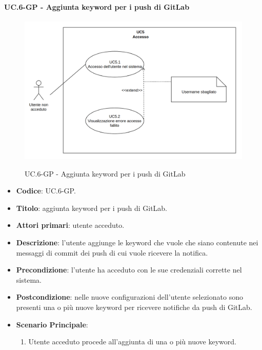 			\paragraph{UC\theuccount.6-GP - Aggiunta keyword per i push di GitLab}
				\begin{figure}[H]
					\centering
					\includegraphics[width=\columnwidth]{img/UC5.png}\\
					\caption{UC\theuccount.6-GP - Aggiunta keyword per i push di GitLab}
				\end{figure}
				\begin{itemize}
					\item \textbf{Codice}: UC\theuccount.6-GP.
					\item \textbf{Titolo}: aggiunta keyword per i push di GitLab.
					\item \textbf{Attori primari}: utente acceduto.
					\item \textbf{Descrizione}: l’utente aggiunge le keyword che vuole che siano contenute
					nei messaggi di commit dei push di cui vuole ricevere la notifica.
					\item \textbf{Precondizione}: l’utente ha acceduto con le sue credenziali corrette nel sistema.
					\item \textbf{Postcondizione}: nelle nuove configurazioni dell'utente selezionato sono
					presenti una o più nuove keyword per ricevere notifiche da push di GitLab.
					\item \textbf{Scenario Principale}:
					\begin{enumerate}
						\item Utente acceduto procede all'aggiunta di una o più nuove keyword.
					\end{enumerate}
				\end{itemize}